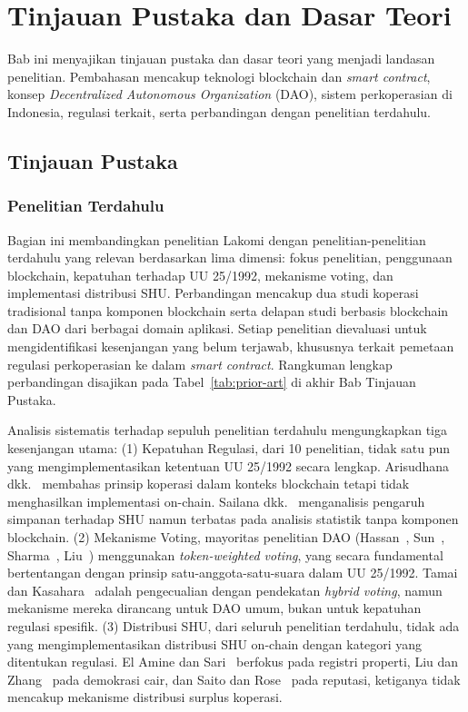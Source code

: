 \chapter{Tinjauan Pustaka dan Dasar Teori}
\label{ch2}

Bab ini menyajikan tinjauan pustaka dan dasar teori yang menjadi landasan penelitian. Pembahasan mencakup teknologi blockchain dan \textit{smart contract}, konsep \textit{Decentralized Autonomous Organization} (DAO), sistem perkoperasian di Indonesia, regulasi terkait, serta perbandingan dengan penelitian terdahulu.


\section{Tinjauan Pustaka}
\subsection{Penelitian Terdahulu}

Bagian ini membandingkan penelitian Lakomi dengan penelitian-penelitian terdahulu yang relevan berdasarkan lima dimensi: fokus penelitian, penggunaan blockchain, kepatuhan terhadap UU 25/1992, mekanisme voting, dan implementasi distribusi SHU. Perbandingan mencakup dua studi koperasi tradisional tanpa komponen blockchain serta delapan studi berbasis blockchain dan DAO dari berbagai domain aplikasi. Setiap penelitian dievaluasi untuk mengidentifikasi kesenjangan yang belum terjawab, khususnya terkait pemetaan regulasi perkoperasian ke dalam \textit{smart contract}. Rangkuman lengkap perbandingan disajikan pada Tabel~\ref{tab:prior-art} di akhir Bab Tinjauan Pustaka.

Analisis sistematis terhadap sepuluh penelitian terdahulu mengungkapkan tiga kesenjangan utama: (1) Kepatuhan Regulasi, dari 10 penelitian, tidak satu pun yang mengimplementasikan ketentuan UU 25/1992 secara lengkap. Arisudhana dkk.~\cite{arisudhana2025pelatihan} membahas prinsip koperasi dalam konteks blockchain tetapi tidak menghasilkan implementasi on-chain. Sailana dkk.~\cite{sailana2023pengaruh} menganalisis pengaruh simpanan terhadap SHU namun terbatas pada analisis statistik tanpa komponen blockchain. (2) Mekanisme Voting, mayoritas penelitian DAO (Hassan~\cite{hassan2021dao}, Sun~\cite{sun2022multiparty}, Sharma~\cite{sharma2024future}, Liu~\cite{liu2024economics}) menggunakan \textit{token-weighted voting}, yang secara fundamental bertentangan dengan prinsip satu-anggota-satu-suara dalam UU 25/1992. Tamai dan Kasahara~\cite{tamai2024dao} adalah pengecualian dengan pendekatan \textit{hybrid voting}, namun mekanisme mereka dirancang untuk DAO umum, bukan untuk kepatuhan regulasi spesifik. (3) Distribusi SHU, dari seluruh penelitian terdahulu, tidak ada yang mengimplementasikan distribusi SHU on-chain dengan kategori yang ditentukan regulasi. El Amine dan Sari~\cite{elamine2024blockchain} berfokus pada registri properti, Liu dan Zhang~\cite{liu2024economics} pada demokrasi cair, dan Saito dan Rose~\cite{saito2023reputation} pada reputasi, ketiganya tidak mencakup mekanisme distribusi surplus koperasi.

